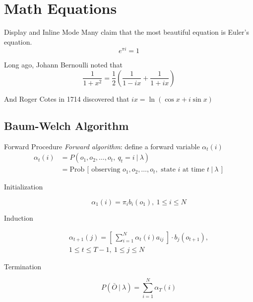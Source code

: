 \documentclass[10pt]{beamer}
\begin{document}
\section{Math Equations}

\begin{frame}{Display and Inline Mode}
  Many claim that the most beautiful equation is Euler's equation.
  \[ e^{\pi i} = 1 \]

  Long ago, Johann Bernoulli noted that
  $$ \frac{1}{1+x^2} = \frac{1}{2}\left( \frac{1}{1-ix} + \frac{1}{1+ix} \right) $$

  And Roger Cotes in 1714 discovered that $ ix = \ln(\cos x + i \sin x) $
\end{frame}

\subsection{Baum-Welch Algorithm}

\begin{frame}{Forward Procedure}
  \textit{Forward algorithm}: define a forward variable $\alpha_t(i)$
  \begin{align}
    \alpha_t (i)
     & = P(o_1, o_2, \dots, o_t,\ q_t = i\ |\ \lambda)                                                              \\
     & = \text{Prob}\,[\,\text{observing } o_1, o_2, \dots, o_t, \text{ state } i \text{ at time } t\ |\ \lambda\,]
  \end{align}

  \begin{description}
    \item[Initialization]
          \begin{equation}
            \alpha_1(i) = \pi_i b_i (o_1),\ 1 \leq i \leq N
          \end{equation}
    \item[Induction]
          \begin{multline}
            \alpha_{t+1}(j) = \left[\ \sum_{i=1}^{N} \alpha_t(i) a_{i j}\ \right] \cdot b_j(o_{t+1}),\\
            1 \leq t \leq T-1,\ 1 \leq j \leq N
          \end{multline}
    \item[Termination]
          \begin{equation}
            P\left( \bar{O}\ |\ \lambda \right) = \sum_{i=1}^{N} \alpha_T(i)
          \end{equation}
  \end{description}
\end{frame}
\end{document}
